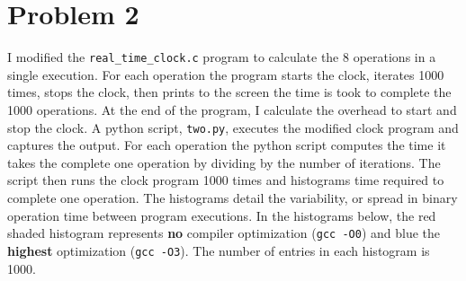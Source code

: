 \documentclass[singlepage,notitlepage,nofootinbib,12pt]{revtex4-1}
\begin{document}
\section{Problem 2}
I modified the \verb|real_time_clock.c| program to calculate the 8 operations in a single execution. For each operation the program starts the clock, iterates 1000 times, stops the clock, then prints to the screen the time is took to complete the 1000 operations. At the end of the program, I calculate the overhead to start and stop the clock. A python script, \verb|two.py|, executes the modified clock program and captures the output. For each operation the python script computes the time it takes the complete one operation by dividing by the number of iterations. The script then runs the clock program 1000 times and histograms time required to complete one operation. The histograms detail the variability, or spread in binary operation time between program executions. In the histograms below, the red shaded histogram represents {\bf no} compiler optimization (\verb|gcc -O0|) and blue the {\bf highest} optimization (\verb|gcc -O3|). The number of entries in each histogram is 1000.
\end{document}
